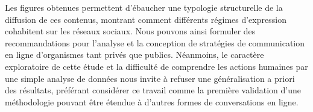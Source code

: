 Les figures obtenues permettent d’ébaucher une typologie structurelle de la diffusion de ces contenus, montrant comment différents régimes d'expression cohabitent sur les réseaux sociaux. Nous pouvons ainsi formuler des recommandations pour l’analyse et la conception de stratégies de communication en ligne d’organismes tant privés que publics. Néanmoins, le caractère exploratoire de cette étude et la difficulté de comprendre les actions humaines par une simple analyse de données nous invite à refuser une généralisation a priori des résultats, préférant considérer ce travail comme la première validation d’une méthodologie pouvant être étendue à d’autres formes de conversations en ligne.


